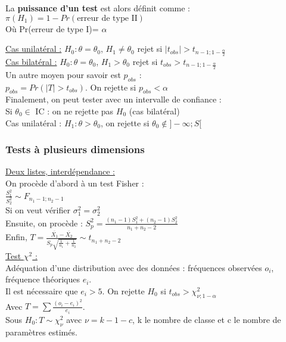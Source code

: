 \documentclass[../main.tex]{subfiles}
\begin{document}
La \textbf{puissance d'un test} est alors définit comme : $\pi (H_1) = 1-Pr(\textrm{erreur de type II})$\\
Où Pr(erreur de type I)= $\alpha$

\underline{Cas unilatéral :}  $H_0 : \theta = \theta_0$, $H_1 \neq \theta_0$ rejet si $\lvert t_{obs}\rvert > t_{n-1; 1-\frac{\alpha}{2}}$ \\
\underline{Cas bilatéral :} $H_0 : \theta = \theta_0$, $H_1 > \theta_0$ rejet si $t_{obs} > t_{n-1; 1-\frac{\alpha}{2}}$ \\

Un autre moyen pour savoir est $p_{obs}$ : \\
$p_{obs} = Pr(\lvert T \rvert > t_{obs})$. On rejette si $p_{obs} < \alpha$\\

Finalement, on peut tester avec un intervalle de confiance :\\
Si $\theta_0 \in$ IC : on ne rejette pas $H_0$ (cas bilatéral)\\
Cas unilatéral : $H_1 : \theta > \theta_0$, on rejette si $\theta_0 \notin ]-\infty; S[$\\

\subsubsection{Tests à plusieurs dimensions}
\quad \underline{Deux listes, interdépendance :}\\
On procède d'abord à un test Fisher :\\
$\frac{S_1^2}{S_2^2} \sim F_{n_1-1; n_2-1}$\\
Si on veut vérifier $\sigma_1^2 = \sigma_2^2$\\
Ensuite, on procède : $S_p^2 = \frac{(n_1-1)S_1^2 + (n_2-1)S_2^2}{n_1+n_2-2}$\\

Enfin, $T = \frac{\overline{X_1}-\overline{X_2}}{S_p \sqrt{\frac{1}{n_1}+\frac{1}{n_2}}} \sim t_{n_1+n_2-2}$\\

\quad \underline{Test $\chi^2$ :}\\
Adéquation d'une distribution avec des données : fréquences observées $ o_i$, fréquence théoriques $e_i$.\\
Il est nécessaire que $e_i > 5$. On rejette $H_0$ si $t_{obs} > \chi^2_{\nu; 1-\alpha}$\\
Avec $T = \sum \frac{(o_i-e_i)^2}{e_i}$.\\
Sous $H_0 : T\sim \chi_{\nu}^2$ avec $\nu = k-1-c$, k le nombre de classe et c le nombre de paramètres estimés.\\
\end{document}
